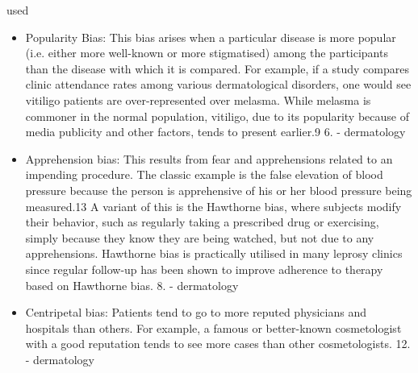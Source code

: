 \begin{refsection}
		
		\rawcitationstart
		used
		\begin{itemize}		
			\rawcitationusedstart
			\item Popularity Bias: This bias arises when a particular disease is more popular (i.e. either more well-known or more stigmatised) among the participants than the disease with which it is compared. For example, if a study compares clinic attendance rates among various dermatological disorders, one would see vitiligo patients are over-represented over melasma. While melasma is commoner in the normal population, vitiligo, due to its popularity because of media publicity and other factors, tends to present earlier.9 6. \autocite{Chakraborty_2024} - dermatology
			
			\item  Apprehension bias: This results from fear and apprehensions related to an impending procedure. The classic example is the false elevation of blood pressure because the person is apprehensive of his or her blood pressure being measured.13 A variant of this is the Hawthorne bias, where subjects modify their behavior, such as regularly taking a prescribed drug or exercising, simply because they know they are being watched, but not due to any apprehensions. Hawthorne bias is practically utilised in many leprosy clinics since regular follow-up has been shown to improve adherence to therapy based on Hawthorne bias. 8. \autocite{Chakraborty_2024} - dermatology
			
			\item Centripetal bias: Patients tend to go to more reputed physicians and hospitals than others. For example, a famous or better-known cosmetologist with a good reputation tends to see more cases than other cosmetologists. 12.\autocite{Chakraborty_2024}  - dermatology
			\rawcitationusedend
		\end{itemize}
		\rawcitationend
			
		
		
		\printbibliography[title=Appendix Bibliography]
	\end{refsection}
%


